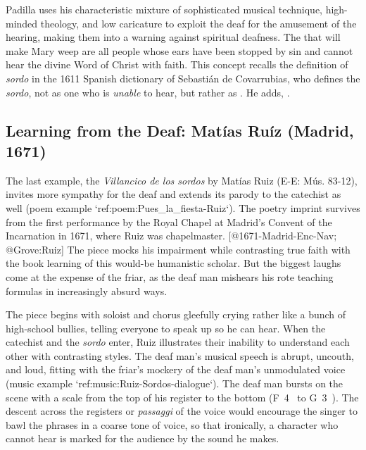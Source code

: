 Padilla uses his characteristic mixture of sophisticated musical technique, high-minded theology, and low caricature to exploit the deaf for the amusement of the hearing, making them into a warning against spiritual deafness.
The  that will make Mary weep are all people whose ears have been stopped by sin and cannot hear the divine Word of Christ with faith.
This concept recalls the definition of \emph{sordo} in the 1611 Spanish dictionary of Sebastián de Covarrubias, who defines the \emph{sordo}, not as one who is \emph{unable} to hear, but rather as .
He adds, .
\Autocite[: .]{Covarrubias:Tesoro}


\subsection{Learning from the Deaf: Matías Ruíz (Madrid, 1671)}

The last example, the \emph{Villancico de los sordos} by Matías Ruiz (E-E: Mús.
83-12), invites more sympathy for the deaf and extends its parody to the catechist as well (poem example `ref:poem:Pues_la_fiesta-Ruiz`).
The poetry imprint survives from the first performance by the Royal Chapel at Madrid's Convent of the Incarnation in 1671, where Ruiz was chapelmaster.
[@1671-Madrid-Enc-Nav; @Grove:Ruiz]
The piece mocks his impairment while contrasting true faith with the book learning of this would-be humanistic scholar.
But the biggest laughs come at the expense of the friar, as the deaf man mishears his rote teaching formulas in increasingly absurd ways.


\label{poem:Pues_la_fiesta-Ruiz}

The piece begins with soloist and chorus gleefully crying  rather like a bunch of high-school bullies, telling everyone to speak up so he can hear.
When the catechist and the \emph{sordo} enter, Ruiz illustrates their inability to understand each other with contrasting styles.
The deaf man's musical speech is abrupt, uncouth, and loud, fitting with the friar's mockery of the deaf man's unmodulated voice  (music example `ref:music:Ruiz-Sordos-dialogue`).
The deaf man bursts on the scene with a scale from the top of his register to the bottom (F~4~ to G~3~).
The descent across the registers or \emph{passaggi} of the voice would encourage the singer to bawl the phrases in a coarse tone of voice, so that ironically, a character who cannot hear is marked for the audience by the sound he makes.


